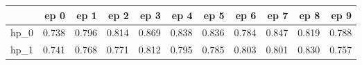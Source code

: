 \begin{tabular}{lrrrrrrrrrr}
\toprule
{} &   ep 0 &   ep 1 &   ep 2 &   ep 3 &   ep 4 &   ep 5 &   ep 6 &   ep 7 &   ep 8 &   ep 9 \\
\midrule
hp\_0 &  0.738 &  0.796 &  0.814 &  0.869 &  0.838 &  0.836 &  0.784 &  0.847 &  0.819 &  0.788 \\
hp\_1 &  0.741 &  0.768 &  0.771 &  0.812 &  0.795 &  0.785 &  0.803 &  0.801 &  0.830 &  0.757 \\
\bottomrule
\end{tabular}

